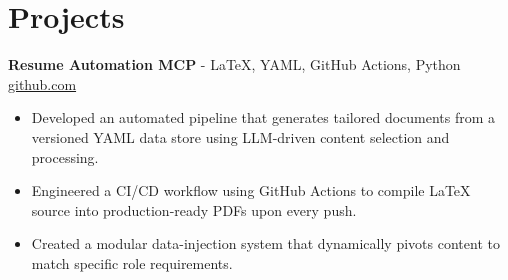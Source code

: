 \documentclass[11pt]{article}
\begin{document}

\vspace{-18.5pt}

\section*{Projects}

\textbf{Resume Automation MCP}{ - LaTeX, YAML, GitHub Actions, Python} \hfill \href{https://github.com/Monica20030707/Tex_OrangeLeaf-mcp}{github.com}
\vspace{-9pt}
\begin{itemize}
  \item Developed an automated pipeline that generates tailored documents from a versioned YAML data store using LLM-driven content selection and processing.
  \item Engineered a CI/CD workflow using GitHub Actions to compile LaTeX source into production-ready PDFs upon every push.
  \item Created a modular data-injection system that dynamically pivots content to match specific role requirements.
\end{itemize}
\end{document}
